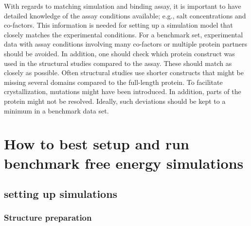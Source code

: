 \documentclass[9pt,bestpractices]{livecoms}
\begin{document}
With regards to matching simulation and binding assay, it is important to have detailed knowledge of the assay conditions available; e.g., salt concentrations and co-factors. This information is needed for setting up a simulation model that closely matches the experimental conditions. For a benchmark set, experimental data with assay conditions involving many co-factors or multiple protein partners should be avoided. In addition, one should check which protein construct was used in the structural studies compared to the assay. These should match as closely as possible. Often structural studies use shorter constructs that might be missing several domains compared to the full-length protein. To facilitate crystallization, mutations might have been introduced. In addition, parts of the protein might not be resolved. Ideally, such deviations should be kept to a minimum in a benchmark data set.


\section{How to best setup and run benchmark free energy simulations}

\subsection{setting up simulations}
\label{sec:setup}


\subsubsection{Structure preparation}
\label{sec:prep}
\end{document}

